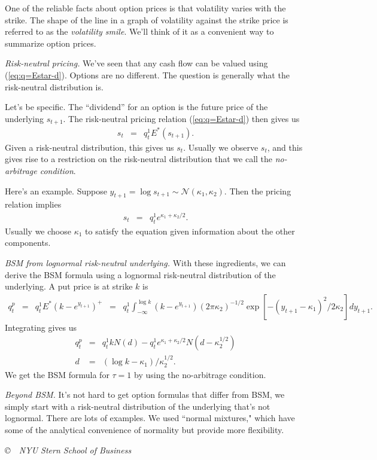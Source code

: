 \documentclass[11pt]{article}
\begin{document}
One of the reliable facts about option prices is that volatility varies with the strike.
The shape of the line in a  graph of volatility against the strike price 
is referred to as the {\it volatility smile\/}.
We'll think of it as a convenient way to summarize option prices.  

{\it Risk-neutral pricing.\/} 
We've seen that any cash flow can be valued using (\ref{eq:q=Estar-d}).
Options are no different.  
The question is generally what the risk-neutral distribution is.

Let's be specific.  
The ``dividend'' for an option is the future price of the underlying $s_{t+1}$.  
The risk-neutral pricing relation (\ref{eq:q=Estar-d}) then gives us 
\begin{eqnarray*}
    s_t &=& q^1_t  E^* (s_{t+1}) .
\end{eqnarray*}
Given a risk-neutral distribution, this gives us $s_t$.  
Usually we observe $s_t$, and this gives rise to a restriction 
on the risk-neutral distribution that we call the
{\it no-arbitrage condition\/}.

Here's an example.  
Suppose $y_{t+1} = \log s_{t+1} \sim \mathcal{N}(\kappa_1, \kappa_2)$.
Then the pricing relation implies 
\begin{eqnarray*}
    s_t &=& q^1_t  e^{\kappa_1 + \kappa_2/2} .
\end{eqnarray*}
Usually we choose $\kappa_1$ to satisfy the equation given information
about the other components.  


{\it BSM from lognormal risk-neutral underlying.\/}
With these ingredients, we can derive the BSM formula using
a lognormal risk-neutral distribution of the underlying.  
A put price is at strike $k$ is 
\begin{eqnarray*}
    q^p_t &=& q^1_t  E^* (k-e^{y_{t+1}})^+ 
          \;\;=\;\;  q^1_t  \int_{-\infty}^{\log k} 
          (k-e^{y_{t+1}}) (2 \pi \kappa_2)^{-1/2}
          \exp[ - (y_{t+1} - \kappa_1)^2/2 \kappa_2] d y_{t+1} .       
\end{eqnarray*}
Integrating gives us 
\begin{eqnarray*}
    q^p_t &=& q^1_t k N(d) - q^1_t e^{\kappa_1 + \kappa_2/2} N(d-\kappa_2^{1/2}) \\
    d &=& (\log k - \kappa_1)/\kappa_2^{1/2} .
\end{eqnarray*}
We get the BSM formula for $\tau=1$ by using the no-arbitrage condition.  


{\it Beyond BSM.\/}
It's not hard to get option formulas that differ from BSM, 
we simply start with a risk-neutral distribution of the underlying
that's not lognormal.  
There are lots of examples.  
We used ``normal mixtures,"
which have some of the analytical convenience of normality
but provide more flexibility.  


\vfill \centerline{\it \copyright \ \number\year \
NYU Stern School of Business}
\end{document}
